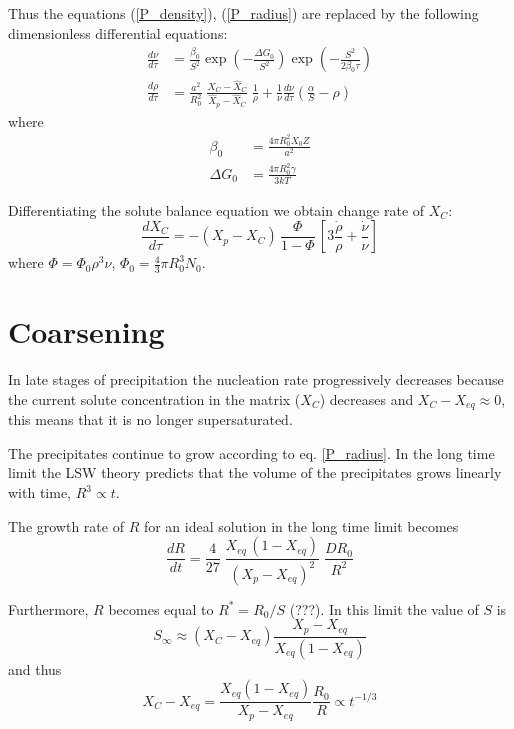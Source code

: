 \documentclass[12pt,a4paper]{article}
\begin{document}
Thus the equations (\ref{P_density}), (\ref{P_radius}) are replaced by the following dimensionless differential equations:
\begin{align}
\frac{d\nu}{d\tau} &= 
\frac{\beta_0}{S^2} 
\exp\left( -\frac{\Delta G_0}{S^2}\right)  
\exp\left( -\frac{S^2}{2\beta_0 \tau}\right)  \\
\frac{d\rho}{d\tau} &= \frac{a^2}{R_0^2}  
\; \frac{X_C - \hat{X}_C}{\hat{X}_p - \hat{X}_C} 
\; \frac{1}{\rho}
+ 
\frac{1}{\nu}\frac{d\nu}{d\tau}
\left( \frac{\alpha}{S} - \rho \right)
\end{align}
where
\begin{align}
\beta_0 &= \frac{4\pi R_0^2 X_{0}Z}{a^2} \\
\Delta G_0 &= \frac{4\pi R_0^2 \gamma}{3kT}  
\end{align}

Differentiating the solute balance equation we obtain change rate of $X_C$:
\begin{equation}
\frac{dX_C}{d\tau} = -(X_p - X_C)\, \frac{\Phi}{1-\Phi} \,
\left[ 3\frac{\dot{\rho}}{\rho} + \frac{\dot{\nu}}{\nu} \right]
\end{equation}
where $\Phi = \Phi_0 \rho^3 \nu$, $\Phi_0 = \frac{4}{3}\pi R_0^3 N_0$.


\section{Coarsening}
In late stages of precipitation the nucleation rate progressively decreases because the current solute concentration in the matrix ($X_C$) decreases and $X_C - X_{eq} \approx 0$, this means that it is no longer supersaturated. 

The precipitates continue to grow according to eq. \eqref{P_radius}. In the long time limit the LSW theory predicts that the volume of the precipitates grows linearly with time, $R^3 \propto t$.

The growth rate of $R$ for an ideal solution in the long time limit becomes \citep{Calderon-1994-Ostwaldripeningin}
\begin{equation}
\label{R_coarsening}
\frac{dR}{dt} = \frac{4}{27}
\;\frac{X_{eq}\, (1-X_{eq})}{(X_{p} - X_{eq} )^2}
\;\frac{D R_0}{R^2}
\end{equation}

Furthermore, $R$ becomes equal to $R^*=R_0/S$ \citep{Deschamps-1998-Influenceofpredefo} (???). In this limit the value of $S$ is
\begin{equation}
S_\infty \approx (X_C-X_{eq}) \frac{X_p-X_{eq}}{X_{eq}(1-X_{eq})}
\end{equation}
and thus
\begin{equation}
X_C - X_{eq} = \frac{X_{eq}(1-X_{eq})}{X_p-X_{eq}} \frac{R_0}{R} \propto t^{-1/3}
\end{equation}
\end{document}
